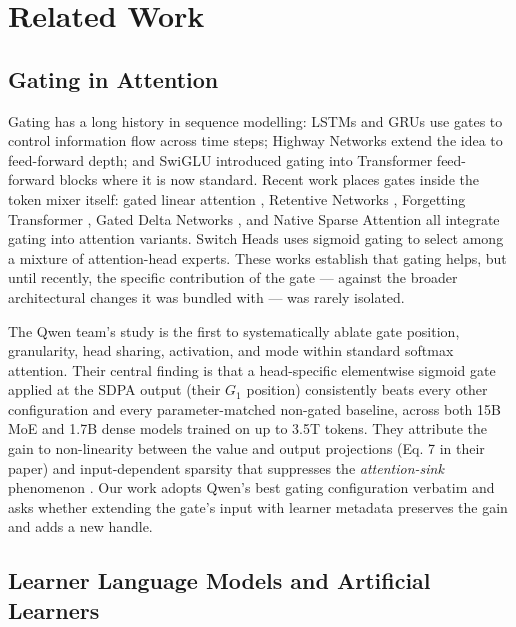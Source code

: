 \section{Related Work}
\label{sec:related}

\subsection{Gating in Attention}

Gating has a long history in sequence modelling: LSTMs
\citep{hochreiter1997long} and GRUs \citep{dey2017gru} use gates to
control information flow across time steps; Highway Networks
\citep{srivastava2015highway} extend the idea to feed-forward depth;
and SwiGLU \citep{shazeer2020glu} introduced gating into Transformer
feed-forward blocks where it is now standard. Recent work places gates
inside the token mixer itself: gated linear attention
\citep{hua2022transformer}, Retentive Networks \citep{sun2023retentive},
Forgetting Transformer \citep{lin2025forgetting}, Gated Delta Networks
\citep{yang2024gated}, and Native Sparse Attention \citep{yuan2025nsa}
all integrate gating into attention variants. Switch Heads
\citep{csordas2024switchhead} uses sigmoid gating to select among a
mixture of attention-head experts. These works establish that gating
helps, but until recently, the specific contribution of the gate ---
against the broader architectural changes it was bundled with --- was
rarely isolated.

The Qwen team's study \citep{qiu2025gated} is the first to
systematically ablate gate position, granularity, head sharing,
activation, and mode within standard softmax attention. Their central
finding is that a head-specific elementwise sigmoid gate applied at the
SDPA output (their $G_1$ position) consistently beats every other
configuration and every parameter-matched non-gated baseline, across
both 15B MoE and 1.7B dense models trained on up to 3.5T tokens. They
attribute the gain to non-linearity between the value and output
projections (Eq. 7 in their paper) and input-dependent sparsity that
suppresses the \emph{attention-sink} phenomenon
\citep{xiao2023efficient,sun2024massive}. Our work adopts Qwen's best
gating configuration verbatim and asks whether extending the gate's
input with learner metadata preserves the gain and adds a new handle.

\subsection{Learner Language Models and Artificial Learners}

